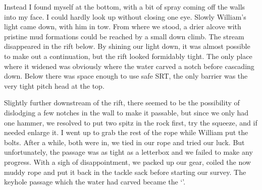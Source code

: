 Instead I found myself at the bottom, with a bit of spray coming off the walls into my face. I could hardly look up without closing one eye. Slowly William's light came down, with him in tow. From where we stood, a drier alcove with pristine mud formations could be reached by a small down climb. The stream disappeared in the rift below. By shining our light down, it was almost possible to make out a continuation, but the rift looked formidably tight. The only place where it widened was obviously where the water carved a notch before cascading down. Below there was space enough to use safe SRT, the only barrier was the very tight pitch head at the top.

Slightly further downstream of the rift, there seemed to be the possibility of dislodging a few notches in the wall to make it passable, but since we only had one hammer, we resolved to put two spitz in the rock first, try the squeeze, and if needed enlarge it. I went up to grab the rest of the rope while William put the bolts. After a while, both were in, we tied in our rope and tried our luck. But unfortunately, the passage was as tight as a letterbox and we failed to make any progress. With a sigh of disappointment, we packed up our gear, coiled the now muddy rope and put it back in the tackle sack before starting our survey. The keyhole passage which the water had carved became the `'.

